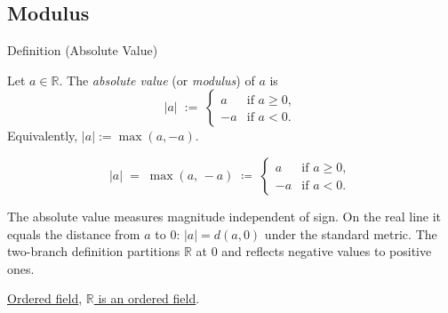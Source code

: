 
\subsection*{Modulus}
\label{sec:modulus}

\begin{definitionbox}{Definition (Absolute Value)}
\begin{definition}
\label{def:absolute-value}
Let $a \in \mathbb{R}$.  The \emph{absolute value} (or \emph{modulus}) of
$a$ is
\[
  \lvert a \rvert
  \;:=\;
  \begin{cases}
    a  & \text{if } a \ge 0, \\
    -a & \text{if } a < 0.
  \end{cases}
\]
Equivalently, $\lvert a \rvert := \max(a, -a)$.
\end{definition}
\end{definitionbox}

\begin{remark*}
\[
  \lvert a \rvert
  \;=\;
  \max(a,\,-a)
  \;\coloneqq\;
  \begin{cases}
    a  & \text{if } a \ge 0, \\
    -a & \text{if } a < 0.
  \end{cases}
\]
\end{remark*}

\begin{remark*}[Interpretation]
The absolute value measures magnitude independent of sign.  On the real
line it equals the distance from $a$ to $0$: $\lvert a \rvert = d(a, 0)$
under the standard metric.  The two-branch definition partitions
$\mathbb{R}$ at $0$ and reflects negative values to positive ones.
\end{remark*}

\begin{dependencies}
\hyperref[def:real-ordered-field]{Ordered field},
\hyperref[thm:q-is-an-ordered-field]{$\mathbb{R}$ is an ordered field}.
\end{dependencies}


